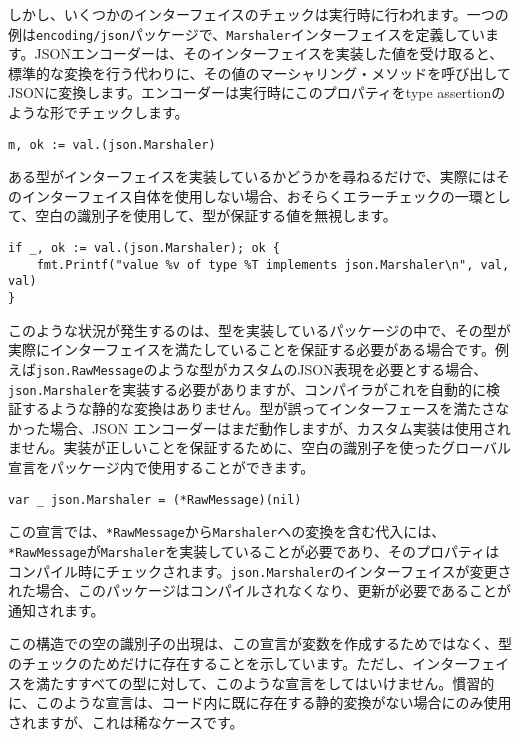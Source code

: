 \documentclass{jsarticle}
\begin{document}
しかし、いくつかのインターフェイスのチェックは実行時に行われます。一つの例は{\texttt{encoding/json}}パッケージで、{\texttt{Marshaler}}インターフェイスを定義しています。JSONエンコーダーは、そのインターフェイスを実装した値を受け取ると、標準的な変換を行う代わりに、その値のマーシャリング・メソッドを呼び出してJSONに変換します。エンコーダーは実行時にこのプロパティを{type
assertion}のような形でチェックします。

\begin{lstlisting}[numbers=none]
m, ok := val.(json.Marshaler)
\end{lstlisting}

ある型がインターフェイスを実装しているかどうかを尋ねるだけで、実際にはそのインターフェイス自体を使用しない場合、おそらくエラーチェックの一環として、空白の識別子を使用して、型が保証する値を無視します。

\begin{lstlisting}[numbers=none]
if _, ok := val.(json.Marshaler); ok {
    fmt.Printf("value %v of type %T implements json.Marshaler\n", val, val)
}
\end{lstlisting}

このような状況が発生するのは、型を実装しているパッケージの中で、その型が実際にインターフェイスを満たしていることを保証する必要がある場合です。例えば{\texttt{json.RawMessage}}のような型がカスタムのJSON表現を必要とする場合、\texttt{json.Marshaler}を実装する必要がありますが、コンパイラがこれを自動的に検証するような静的な変換はありません。型が誤ってインターフェースを満たさなかった場合、JSON
エンコーダーはまだ動作しますが、カスタム実装は使用されません。実装が正しいことを保証するために、空白の識別子を使ったグローバル宣言をパッケージ内で使用することができます。

\begin{lstlisting}[numbers=none]
var _ json.Marshaler = (*RawMessage)(nil)
\end{lstlisting}

この宣言では、\texttt{*RawMessage}から\texttt{Marshaler}への変換を含む代入には、\texttt{*RawMessage}が\texttt{Marshaler}を実装していることが必要であり、そのプロパティはコンパイル時にチェックされます。\texttt{json.Marshaler}のインターフェイスが変更された場合、このパッケージはコンパイルされなくなり、更新が必要であることが通知されます。

この構造での空の識別子の出現は、この宣言が変数を作成するためではなく、型のチェックのためだけに存在することを示しています。ただし、インターフェイスを満たすすべての型に対して、このような宣言をしてはいけません。慣習的に、このような宣言は、コード内に既に存在する静的変換がない場合にのみ使用されますが、これは稀なケースです。
\end{document}
